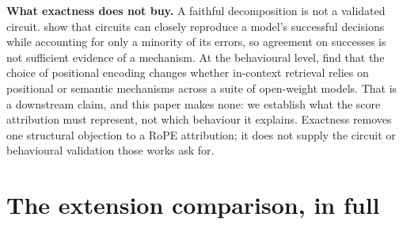 \documentclass{article}
\theoremstyle{plain}
\theoremstyle{remark}
\begin{document}
\textbf{What exactness does not buy.} A faithful decomposition is not a
validated circuit. \citet{zhang2026circuiteval} show that circuits can closely
reproduce a model's successful decisions while accounting for only a minority of
its errors, so agreement on successes is not sufficient evidence of a mechanism.
At the behavioural level, \citet{enouen2026shifting} find that the choice of
positional encoding changes whether in-context retrieval relies on positional
or semantic mechanisms across a suite of open-weight models. That is a downstream
claim, and this paper makes none: we establish what the score attribution must
represent, not which behaviour it explains. Exactness removes one structural
objection to a RoPE attribution; it does not supply the circuit or behavioural
validation those works ask for.

\section{The extension comparison, in full}
\label{app:figs:context}
\end{document}
